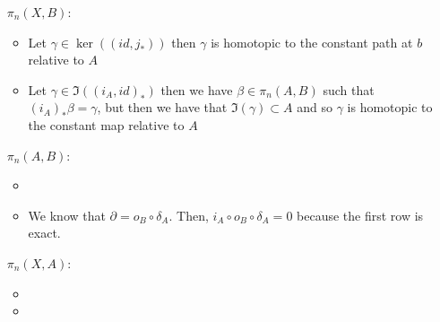 \documentclass{scrartcl}
\begin{document}
\begin{itemize}
	\item[$\pi_n(X,B)$:]
		\begin{itemize}
			\item Let $\gamma \in \ker((id, j_*))$ then $\gamma$ is homotopic to the
			      constant path at $b$ relative to $A$ %
			\item Let $\gamma \in \Im((i_A, id)_*)$ then we have $\beta \in
				      \pi_n(A,B)$ such that $(i_A)_* \beta = \gamma$, but then we have that
			      $\Im(\gamma) \subset A$ and so $\gamma$ is homotopic to the constant
			      map relative to $A$
		\end{itemize}
	\item[$\pi_n(A,B)$:]
		\begin{itemize}
			\item %
			\item We know that $\partial = o_B \circ \delta_A$. Then, $i_A \circ o_B
				      \circ \delta_A = 0$ because the first row is exact.
		\end{itemize}
	\item[$\pi_n(X,A)$:]
		\begin{itemize}
			\item %
			\item %
		\end{itemize}
\end{itemize}
\end{document}
